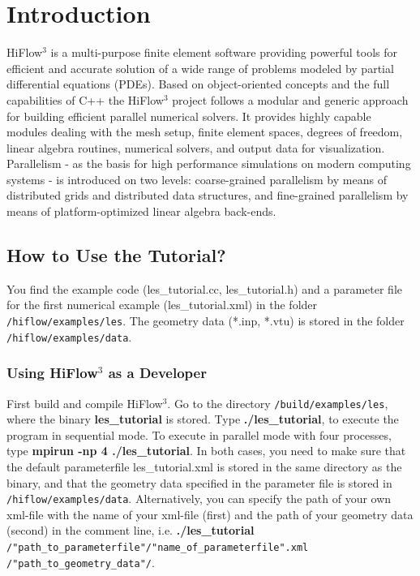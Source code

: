 \documentclass[a4paper, 11pt, twoside]{article}
\begin{document}
\pagestyle{empty}



\tableofcontents

\newpage
\pagestyle{plain}
\vspace{0.5cm}
\section{Introduction}

HiFlow$^3$ is a multi-purpose finite element software providing powerful tools for efficient and accurate solution of a wide range of problems modeled by partial differential equations (PDEs). Based on object-oriented concepts and the full capabilities of C++ the HiFlow$^3$ project follows a modular and generic approach for building efficient parallel numerical solvers. It provides highly capable modules dealing with the mesh setup, finite element spaces, degrees of freedom, linear algebra routines, numerical solvers, and output data for visualization. Parallelism - as the basis for high performance simulations on modern computing systems - is introduced on two levels: coarse-grained parallelism by means of distributed grids and distributed data structures, and fine-grained parallelism by means of platform-optimized linear algebra back-ends.

\subsection{How to Use the Tutorial?}
You find the example code (les\_tutorial.cc, les\_tutorial.h) and a parameter file for the first numerical example (les\_tutorial.xml) in the folder \verb'/hiflow/examples/les'. The geometry data (*.inp, *.vtu) is stored in the folder \verb'/hiflow/examples/data'.

\subsubsection{Using HiFlow$^3$ as a Developer}\label{sectiondeveloper}
First build and compile HiFlow$^3$. Go to the directory \verb'/build/examples/les', where the binary \textbf{les\_tutorial} is stored. Type \textbf{./les\_tutorial}, to execute the program in sequential mode. To execute in parallel mode  with four processes, type \textbf{mpirun -np 4 ./les\_tutorial}. In both cases, you need to make sure that the default parameterfile les\_tutorial.xml is stored in the same directory as the binary, and that the geometry data specified in the parameter file is stored in \verb'/hiflow/examples/data'. Alternatively, you can specify the path of your own xml-file with the name of your xml-file (first) and the path of your geometry data (second) in the comment line, i.e. \textbf{./les\_tutorial} \verb'/"path_to_parameterfile"/"name_of_parameterfile".xml' \verb'/"path_to_geometry_data"/'.
\end{document}
